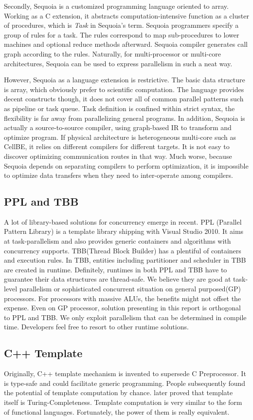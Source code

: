\documentclass[a4paper, 11pt]{article}
\begin{document}
Secondly, Sequoia is a customized programming language oriented to array. Working as a C extension, it abstracts computation-intensive function as a cluster of procedures, which is \emph{Task} in Sequoia's term. Sequoia programmers specify a group of rules for a task. The rules correspond to map sub-procedures to lower machines and optional reduce methods afterward. Sequoia compiler generates call graph according to the rules. Naturally, for multi-processor or multi-core architectures, Sequoia can be used to express parallelism in such a neat way.

However, Sequoia as a language extension is restrictive. The basic data structure is array, which obviously prefer to scientific computation. The language provides decent constructs though, it does not cover all of common parallel patterns such as pipeline or task queue. Task definition is confined within strict syntax, the flexibility is far away from parallelizing general programs.  In addition, Sequoia is actually a source-to-source compiler, using graph-based IR to transform and optimize program. If physical architecture is heterogeneous multi-core such as CellBE, it relies on different compilers for different targets. It is not easy to discover optimizing communication routes in that way. Much worse, because Sequoia depends on separating compilers to perform optimization, it is impossible to optimize data transfers when they need to inter-operate among compilers.
\subsection{PPL and TBB}
A lot of library-based solutions for concurrency emerge in recent. PPL (Parallel Pattern Library) is a template library shipping with Visual Studio 2010. It aims at task-parallelism and also provides generic containers and algorithms with concurrency supports. TBB(Thread Block Builder) has a plentiful of containers and execution rules. In TBB, entities including partitioner and scheduler in TBB are created in runtime. Definitely, runtimes in both PPL and TBB have to guarantee their data structures are thread-safe. We believe they are good at task-level parallelism or sophisticated concurrent situation on general purposed(GP) processors. For processors with massive ALUs, the benefits might not offset the expense. Even on GP processor, solution presenting in this report is orthogonal to PPL and TBB. We only exploit parallelism that can be determined in compile time. Developers feel free to resort to other runtime solutions.
\subsection{C++ Template}
Originally, C++ template mechanism is invented to supersede C Preprocessor. It is type-safe and could facilitate generic programming. People subsequently found the potential of template computation by chance. \cite{todd-temp} later proved that template itself is Turing-Completeness. Template computation is very similar to the form of functional languages. Fortunately, the power of them is really equivalent.
\end{document}
